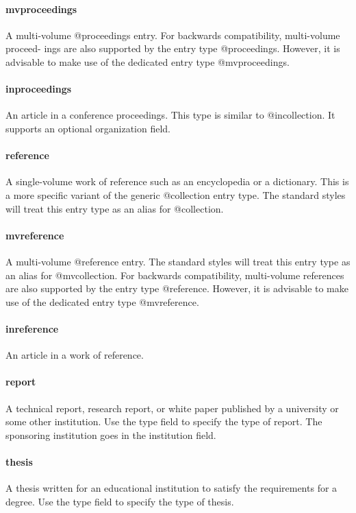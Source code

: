 \documentclass[a4paper,12pt]{report}
\begin{document}
\paragraph{mvproceedings}
A multi-volume @proceedings entry. For backwards compatibility, multi-volume proceed-
ings are also supported by the entry type @proceedings. However, it is advisable to make
use of the dedicated entry type @mvproceedings.

\paragraph{inproceedings}
An article in a conference proceedings. This type is similar to @incollection. It supports
an optional organization field.

\paragraph{reference}
A single-volume work of reference such as an encyclopedia or a dictionary. This is a more
specific variant of the generic @collection entry type. The standard styles will treat this
entry type as an alias for @collection.

\paragraph{mvreference}
A multi-volume @reference entry. The standard styles will treat this entry type as an
alias for @mvcollection. For backwards compatibility, multi-volume references are also
supported by the entry type @reference. However, it is advisable to make use of the
dedicated entry type @mvreference.

\paragraph{inreference}
An article in a work of reference.

\paragraph{report}
A technical report, research report, or white paper published by a university or some other
institution. Use the type field to specify the type of report. The sponsoring institution goes
in the institution field.

\paragraph{thesis}
A thesis written for an educational institution to satisfy the requirements for a degree. Use
the type field to specify the type of thesis.
\end{document}
